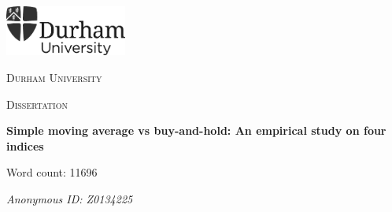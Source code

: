\begin{titlepage}
	\centering
	\includegraphics[width=0.3\textwidth]{images/logo}\par\vspace{1cm}
	{\scshape\LARGE Durham University \par}
	\vspace{3em}
	{\scshape\Large Dissertation\par}
	\vfill
	{\huge\bfseries Simple moving average vs buy-and-hold: An empirical study on four indices \par}
	\vfill
	{\Large Word count: \num{11696} \par}
	\vfill
	{\Large\itshape Anonymous ID: Z0134225\par}
\end{titlepage}
